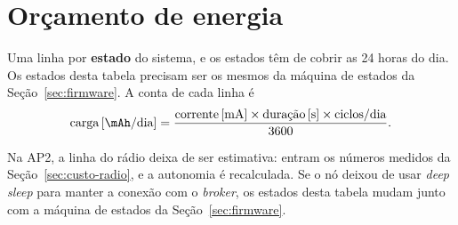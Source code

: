 \chapter{Orçamento de energia}
\label{ap:energia}

\begin{orientacao}
Uma linha por \textbf{estado} do sistema, e os estados têm de cobrir as
24 horas do dia. Os estados desta tabela precisam ser os mesmos da
máquina de estados da Seção~\ref{sec:firmware}. A conta de cada linha é
\[
  \text{carga}\,[\si{\mAh}/\text{dia}] =
  \frac{\text{corrente}\,[\si{\milli\ampere}] \times
        \text{duração}\,[\si{\second}] \times \text{ciclos/dia}}{3600}.
\]
\end{orientacao}

\begin{orientacao}
Na AP2, a linha do rádio deixa de ser estimativa: entram os números
medidos da Seção~\ref{sec:custo-radio}, e a autonomia é recalculada.
Se o nó deixou de usar \emph{deep sleep} para manter a conexão com o
\emph{broker}, os estados desta tabela mudam junto com a máquina de
estados da Seção~\ref{sec:firmware}.
\end{orientacao}

